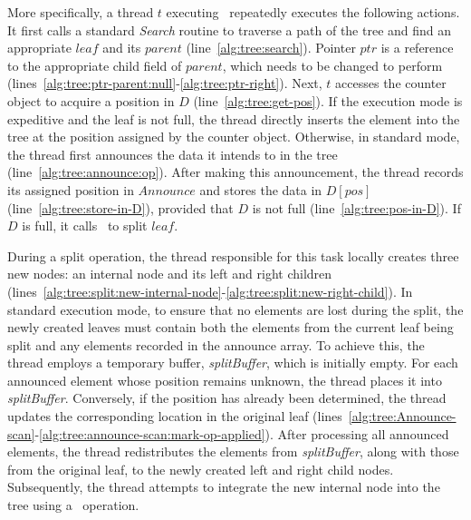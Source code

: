     More specifically, a thread $t$ executing \TreeInsert\ repeatedly executes the following actions. 
    It first calls a standard \textit{Search} routine to traverse a path of the tree and find an appropriate
    $\mathit{leaf}$ and its $\mathit{parent}$ (line~\ref{alg:tree:search}).
    Pointer $\mathit{ptr}$ is a reference to the appropriate child field of $\mathit{parent}$,
    which needs to be changed to perform \TreeInsert  (lines~\ref{alg:tree:ptr-parent:null}-\ref{alg:tree:ptr-right}).
    Next, $t$ accesses the counter object to acquire a position in $D$ (line~\ref{alg:tree:get-pos}).
    If the execution mode is expeditive and the leaf is not full, the thread directly inserts
    the element into the tree at the position assigned by the counter object. Otherwise, in standard mode, the
    thread first announces the data it intends to in the tree (line~\ref{alg:tree:announce:op}).
    After making this announcement, the thread records its assigned position in $\mathit{Announce}$ and
    stores the data in $D[\mathit{pos}] $(line~\ref{alg:tree:store-in-D}), provided that $D$ is not full 
    (line~\ref{alg:tree:pos-in-D}). If $D$ is full, it calls \SplitLeaf\ to split $\mathit{leaf}$.
    
    During a split operation, the thread responsible for this task locally creates three new
    nodes: an internal node and its left and right children  
    (lines~\ref{alg:tree:split:new-internal-node}-\ref{alg:tree:split:new-right-child}).  
    In standard execution mode, to ensure that no elements are lost during the split,  
    the newly created leaves must contain both the elements from the current leaf being split  
    and any elements recorded in the announce array.  
    To achieve this, the thread employs a temporary buffer, \textit{splitBuffer}, which is
    initially empty. For each announced element whose position remains unknown, the thread
    places it into \textit{splitBuffer}. Conversely, if the position has already been
    determined, the thread updates the corresponding location in the original leaf
    (lines~\ref{alg:tree:Announce-scan}-\ref{alg:tree:announce-scan:mark-op-applied}).  
    After processing all announced elements, the thread redistributes the elements from
    \textit{splitBuffer}, along with those from the original leaf, to the newly created left
    and right child nodes. Subsequently, the thread attempts to integrate the new internal
    node into the tree using a \CAS\ operation.  

